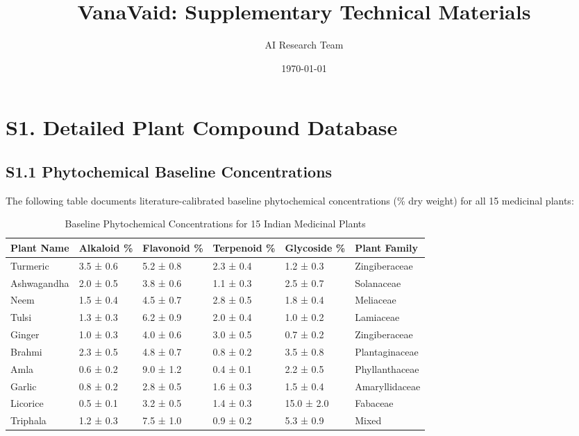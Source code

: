 \documentclass[11pt,a4paper]{article}
\title{\textbf{VanaVaid: Supplementary Technical Materials}}
\author{AI Research Team}
\date{\today}
\begin{document}
\maketitle

\section{S1. Detailed Plant Compound Database}

\subsection{S1.1 Phytochemical Baseline Concentrations}

The following table documents literature-calibrated baseline phytochemical concentrations (\% dry weight) for all 15 medicinal plants:

\begin{table}[H]
\centering
\caption{Baseline Phytochemical Concentrations for 15 Indian Medicinal Plants}
\label{tab:phyto_baseline}
\small
\begin{tabular}{|l|l|l|l|l|l|}
\hline
\textbf{Plant Name} & \textbf{Alkaloid \%} & \textbf{Flavonoid \%} & \textbf{Terpenoid \%} & \textbf{Glycoside \%} & \textbf{Plant Family} \\
\hline
Turmeric & 3.5 ± 0.6 & 5.2 ± 0.8 & 2.3 ± 0.4 & 1.2 ± 0.3 & Zingiberaceae \\
\hline
Ashwagandha & 2.0 ± 0.5 & 3.8 ± 0.6 & 1.1 ± 0.3 & 2.5 ± 0.7 & Solanaceae \\
\hline
Neem & 1.5 ± 0.4 & 4.5 ± 0.7 & 2.8 ± 0.5 & 1.8 ± 0.4 & Meliaceae \\
\hline
Tulsi & 1.3 ± 0.3 & 6.2 ± 0.9 & 2.0 ± 0.4 & 1.0 ± 0.2 & Lamiaceae \\
\hline
Ginger & 1.0 ± 0.3 & 4.0 ± 0.6 & 3.0 ± 0.5 & 0.7 ± 0.2 & Zingiberaceae \\
\hline
Brahmi & 2.3 ± 0.5 & 4.8 ± 0.7 & 0.8 ± 0.2 & 3.5 ± 0.8 & Plantaginaceae \\
\hline
Amla & 0.6 ± 0.2 & 9.0 ± 1.2 & 0.4 ± 0.1 & 2.2 ± 0.5 & Phyllanthaceae \\
\hline
Garlic & 0.8 ± 0.2 & 2.8 ± 0.5 & 1.6 ± 0.3 & 1.5 ± 0.4 & Amaryllidaceae \\
\hline
Licorice & 0.5 ± 0.1 & 3.2 ± 0.5 & 1.4 ± 0.3 & 15.0 ± 2.0 & Fabaceae \\
\hline
Triphala & 1.2 ± 0.3 & 7.5 ± 1.0 & 0.9 ± 0.2 & 5.3 ± 0.9 & Mixed \\
\hline
\end{tabular}
\end{table}
\end{document}
